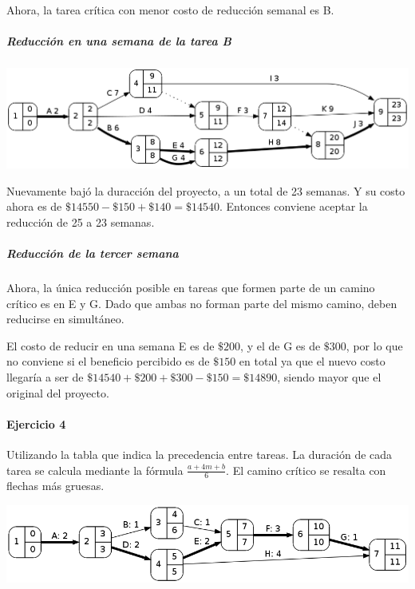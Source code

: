 \documentclass[a4paper,10pt]{article}
\begin{document}
  Ahora, la tarea crítica con menor costo de reducción semanal es B.

  \subparagraph {Reducción en una semana de la tarea B}
  \begin{center}
    \includegraphics[scale=0.4,keepaspectratio=true]{img/ej3-2.png} 
  \end{center}

  Nuevamente bajó la duracción del proyecto, a un total de 23 semanas. Y su costo ahora es de $\$14550 - \$150 + \$140 = \$14540$. Entonces conviene aceptar la reducción de 25 a 23 semanas.

  \subparagraph {Reducción de la tercer semana}
  Ahora, la única reducción posible en tareas que formen parte de un camino crítico es en E y G. Dado que ambas no forman parte del mismo camino, deben reducirse en simultáneo.

  El costo de reducir en una semana E es de $\$200$, y el de G es de $\$300$, por lo que no conviene si el beneficio percibido es de $\$150$ en total ya que el nuevo costo llegaría a ser de $\$14540 + \$200 + \$300 - \$150 = \$14890$, siendo mayor que el original del proyecto.

  
  
\paragraph{Ejercicio 4} Utilizando la tabla que indica la precedencia entre tareas. La duración de cada tarea se calcula mediante la fórmula $\frac{a + 4m + b}{6}$. El camino crítico se resalta con flechas más gruesas.
   \begin{center}
    \includegraphics[scale=0.5,keepaspectratio=true]{img/ej4-1.png} 
  \end{center}
  
\end{document}
